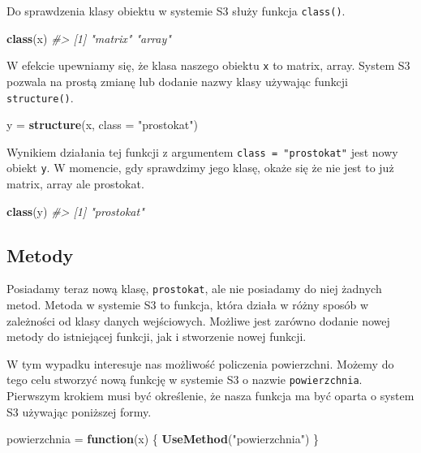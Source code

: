 \documentclass[paper=6in:9in,pagesize=pdftex,headinclude=on,footinclude=on,10pt]{scrbook}
\newenvironment{Shaded}{\begin{snugshade}}{\end{snugshade}}
\newcommand{\CommentTok}[1]{\textcolor[rgb]{0.56,0.35,0.01}{\textit{#1}}}
\newcommand{\ControlFlowTok}[1]{\textcolor[rgb]{0.13,0.29,0.53}{\textbf{#1}}}
\newcommand{\DataTypeTok}[1]{\textcolor[rgb]{0.13,0.29,0.53}{#1}}
\newcommand{\KeywordTok}[1]{\textcolor[rgb]{0.13,0.29,0.53}{\textbf{#1}}}
\newcommand{\NormalTok}[1]{#1}
\newcommand{\StringTok}[1]{\textcolor[rgb]{0.31,0.60,0.02}{#1}}
\begin{document}
Do sprawdzenia klasy obiektu w systemie S3 służy funkcja \texttt{class()}.

\begin{Shaded}
\begin{Highlighting}[]
\KeywordTok{class}\NormalTok{(x)}
\CommentTok{#> [1] "matrix" "array"}
\end{Highlighting}
\end{Shaded}

W efekcie upewniamy się, że klasa naszego obiektu \texttt{x} to matrix, array.
System S3 pozwala na prostą zmianę lub dodanie nazwy klasy używając funkcji \texttt{structure()}.

\begin{Shaded}
\begin{Highlighting}[]
\NormalTok{y =}\StringTok{ }\KeywordTok{structure}\NormalTok{(x, }\DataTypeTok{class =} \StringTok{"prostokat"}\NormalTok{)}
\end{Highlighting}
\end{Shaded}

Wynikiem działania tej funkcji z argumentem \texttt{class\ =\ "prostokat"} jest nowy obiekt \texttt{y}.
W momencie, gdy sprawdzimy jego klasę, okaże się że nie jest to już matrix, array ale prostokat.

\begin{Shaded}
\begin{Highlighting}[]
\KeywordTok{class}\NormalTok{(y)}
\CommentTok{#> [1] "prostokat"}
\end{Highlighting}
\end{Shaded}

\hypertarget{metody}{%
\subsection{Metody}\label{metody}}

Posiadamy teraz nową klasę, \texttt{prostokat}, ale nie posiadamy do niej żadnych metod.
Metoda w systemie S3 to funkcja, która działa w różny sposób w zależności od klasy danych wejściowych.
Możliwe jest zarówno dodanie nowej metody do istniejącej funkcji, jak i stworzenie nowej funkcji.

W tym wypadku interesuje nas możliwość policzenia powierzchni.
Możemy do tego celu stworzyć nową funkcję w systemie S3 o nazwie \texttt{powierzchnia}.
Pierwszym krokiem musi być określenie, że nasza funkcja ma być oparta o system S3 używając poniższej formy.

\begin{Shaded}
\begin{Highlighting}[]
\NormalTok{powierzchnia =}\StringTok{ }\ControlFlowTok{function}\NormalTok{(x) \{}
  \KeywordTok{UseMethod}\NormalTok{(}\StringTok{"powierzchnia"}\NormalTok{)}
\NormalTok{\}}
\end{Highlighting}
\end{Shaded}
\end{document}
